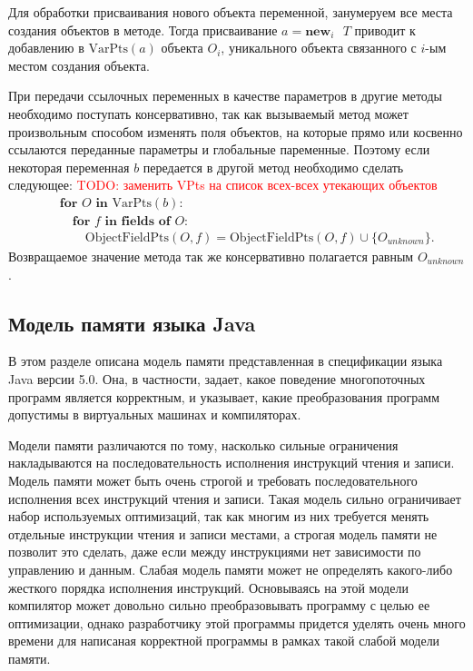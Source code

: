 \documentclass[14pt,titlepage]{extarticle}
\newcommand{\NEWi}[1]{\textbf{new}_{#1}\textbf{ }}
\newcommand{\VPts}[1]{\textrm{VarPts}(#1)}
\newcommand{\OFPts}[2]{\textrm{ObjectFieldPts}(#1, #2)}
\newcommand{\todo}[1]{\textcolor{red}{TODO: #1}}
\begin{document}
      Для обработки присваивания нового объекта переменной, занумеруем
      все места создания объектов в методе. Тогда присваивание $a = \NEWi{i} T$
      приводит к добавлению в $\VPts{a}$ объекта $O_i$, уникального
      объекта связанного с $i$-ым местом создания объекта.

      При передачи ссылочных переменных в качестве параметров в другие
      методы необходимо поступать консервативно, так как вызываемый метод
      может произвольным способом изменять поля объектов, на которые прямо или
      косвенно ссылаются переданные параметры и глобальные паременные. Поэтому
      если некоторая переменная $b$ передается в другой метод необходимо
      сделать следующее:
      \todo{заменить VPts на список всех-всех утекающих объектов}
      \begin{eqnarray*}
        &&\textbf{for } O \textbf{ in } \VPts{b} \colon \\
        &&\quad\textbf{for } f \textbf{ in fields of } O \colon \\
        &&\qquad\OFPts{O}{f} = \OFPts{O}{f} \cup \{O_{unknown}\}.
      \end{eqnarray*}
      Возвращаемое значение метода так же консервативно полагается равным
      $O_{unknown}$.

    \subsection{Модель памяти языка Java}

      В этом разделе описана модель памяти представленная в спецификации языка
      Java версии 5.0. Она, в частности, задает, какое поведение многопоточных
      программ является корректным, и указывает, какие преобразования программ
      допустимы в виртуальных машинах и компиляторах.

      Модели памяти различаются по тому, насколько сильные ограничения
      накладываются на последовательность исполнения инструкций чтения и
      записи.
      Модель памяти может быть очень строгой и требовать
      последовательного исполнения всех инструкций чтения и записи.
      Такая модель сильно ограничивает набор используемых оптимизаций,
      так как многим из них требуется менять отдельные инструкции чтения и
      записи местами, а строгая модель памяти не позволит это сделать, даже
      если между инструкциями нет зависимости по управлению и данным.
      Слабая модель памяти может не определять какого-либо жесткого порядка
      исполнения инструкций. Основываясь на этой модели компилятор может
      довольно сильно преобразовывать программу с целью ее оптимизации,
      однако разработчику этой программы придется уделять очень много времени
      для написаная корректной программы в рамках такой слабой модели памяти.
\end{document}
